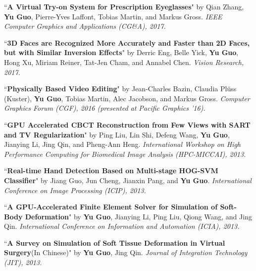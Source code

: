 \documentclass[margin,line]{resume}
\begin{document}
\begin{resume}
	``\textbf{A Virtual Try-on System for Prescription Eyeglasses}" 
	by Qian Zhang, \textbf{Yu Guo}, Pierre-Yves Laffont, Tobias Martin, and Markus Gross. 
	\textsl{IEEE Computer Graphics and Applications (CG\&A), 2017.}\\
	
	\vspace{-5mm}
	
	``\textbf{3D Faces are Recognized More Accurately and Faster than 2D Faces, but with Similar Inversion Effects}" 
	by Derric Eng, Belle Yick, \textbf{Yu Guo}, Hong Xu, Miriam Reiner, Tat-Jen Cham, and Annabel Chen. 
	\textsl{Vision Research, 2017.}\\
	
	\vspace{-5mm}
	
	``\textbf{Physically Based Video Editing}" 
	by Jean-Charles Bazin, Claudia Pl\"{u}ss (Kuster), \textbf{Yu Guo}, Tobias Martin, Alec Jacobson, and Markus Gross. 
	\textsl{Computer Graphics Forum (CGF), 2016 (presented at Pacific Graphics '16).}\\
	
	\vspace{-5mm}
	
	``\textbf{GPU Accelerated CBCT Reconstruction from Few Views with SART and TV Regularization}" 
	by Ping Liu, Lin Shi, Defeng Wang, \textbf{Yu Guo}, Jianying Li, Jing Qin, and Pheng-Ann Heng. 
	\textsl{International Workshop on High Performance Computing for Biomedical Image Analysis (HPC-MICCAI), 2013.}\\
	
	\vspace{-5mm}
	
	``\textbf{Real-time Hand Detection Based on Multi-stage HOG-SVM Classifier}" 
	by Jiang Guo, Jun Cheng, Jianxin Pang, and \textbf{Yu Guo}. 
	\textsl{International Conference on Image Processing (ICIP), 2013.}\\
	
	\vspace{-5mm}
	
	``\textbf{A GPU-Accelerated Finite Element Solver for Simulation of Soft-Body Deformation}" 
	by \textbf{Yu Guo}, Jianying Li, Ping Liu, Qiong Wang, and Jing Qin. 
	\textsl{International Conference on Information and Automation (ICIA), 2013.}\\
	
	\vspace{-5mm}
	
	``\textbf{A Survey on Simulation of Soft Tissue Deformation in Virtual Surgery}(In Chinese)" 
	by \textbf{Yu Guo}, Jing Qin. 
	\textsl{Journal of Integration Technology (JIT), 2013.}\\
	

\end{resume}
\end{document}
